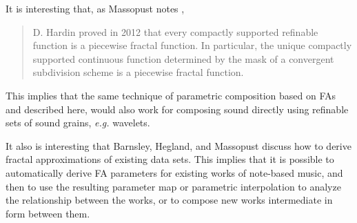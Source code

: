 \documentclass[english,11pt,letterpaper,onecolumn]{scrartcl}
\numberwithin{equation}{section}
\begin{document}
    It is interesting that, as Massopust notes \cite{massopust2017}, 
    \begin{quote}D. Hardin proved in 2012 that every compactly supported 
        refinable function is a piecewise fractal function. In particular, the 
unique 
        compactly supported continuous function determined by the mask of a 
convergent 
        subdivision scheme is a piecewise fractal function. \end{quote} 
    This implies that the same technique of parametric 
    composition based on FAs and described here, would also work for composing 
    sound directly using refinable sets of sound grains, \textit{e.g.} 
wavelets.
    
    It also is interesting that Barnsley, Hegland, and Massopust 
    \cite{2013arXiv1309.0972B} discuss how to derive fractal approximations of 
    existing data sets. This implies that it is possible to automatically 
derive 
    FA parameters for existing works of note-based music, and then to use the 
    resulting parameter map or parametric interpolation to analyze the 
    relationship between the works, or to compose new works intermediate in 
form 
    between them.
    
    \printbibliography
    
\end{document}

